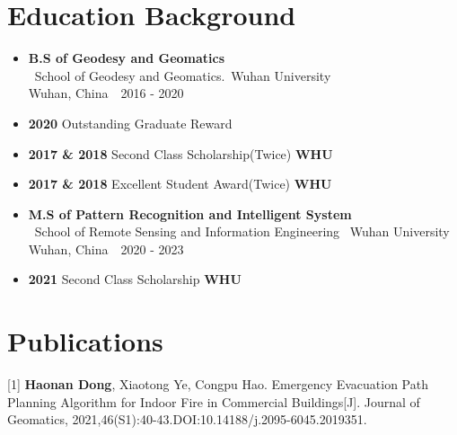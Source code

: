 \documentclass[a4paper]{article}
\begin{document}
\section{Education Background}
\begin{itemize}[itemsep = -0.5em,topsep = 0em]
    \item \textbf{B.S of Geodesy and Geomatics }
          \\\ School of Geodesy and Geomatics.\ Wuhan University\\ Wuhan, China\ \ 2016 - 2020
    \item \textbf{2020} \hspace{3.36cm} Outstanding Graduate Reward
    \item \textbf{2017 \& 2018} \hspace{2cm} Second Class Scholarship(Twice) \hspace{2cm} \textbf{WHU}
    \item \textbf{2017 \& 2018} \hspace{2cm} Excellent Student Award(Twice) \hspace{2cm} \textbf{WHU}
\end{itemize}

\begin{itemize}[itemsep = -0.5em,topsep = 0em]
    \item \textbf{M.S of Pattern Recognition and Intelligent System}
          \\\ School of Remote Sensing and Information Engineering \ Wuhan University\\ Wuhan, China\ \ 2020 - 2023
    \item \textbf{2021} \hspace{3.36cm} Second Class Scholarship \hspace{3.18cm} \textbf{WHU}
\end{itemize}

\section{Publications}
 [1] \textbf{Haonan Dong}, Xiaotong Ye, Congpu Hao. Emergency Evacuation Path Planning Algorithm for Indoor Fire in Commercial Buildings[J]. Journal of Geomatics, 2021,46(S1):40-43.DOI:10.14188/j.2095-6045.2019351.
\end{document}
